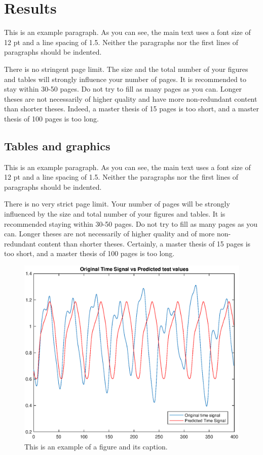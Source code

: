 
\chapter{Results}

This is an example paragraph. As you can see, the main text uses a font size of 12 pt and a line spacing of 1.5. Neither the paragraphs nor the first lines of paragraphs should be indented.

There is no stringent page limit. The size and the total number of your figures and tables will strongly influence your number of pages. It is recommended to stay within 30-50 pages. Do not try to fill as many pages as you can. Longer theses are not necessarily of higher quality and have more non-redundant content than shorter theses. Indeed, a master thesis of 15 pages is too short, and a master thesis of 100 pages is too long.

\section{Tables and graphics}

This is an example paragraph. As you can see, the main text uses a font size of 12 pt and a line spacing of 1.5. Neither the paragraphs nor the first lines of paragraphs should be indented.

There is no very strict page limit. Your number of pages will be strongly influenced by the size and total number of your figures and tables. It is recommended staying within 30-50 pages. Do not try to fill as many pages as you can. Longer theses are not necessarily of higher quality and of more non-redundant content than shorter theses. Certainly, a master thesis of 15 pages is too short, and a master thesis of 100 pages is too long.

\begin{figure}[!ht]
\includegraphics[clip,width=\columnwidth]{Figures/PlotTimeSeriesResult}%
\caption{This is an example of a figure and its caption.}
\label{fig:timeseries}
\end{figure}

